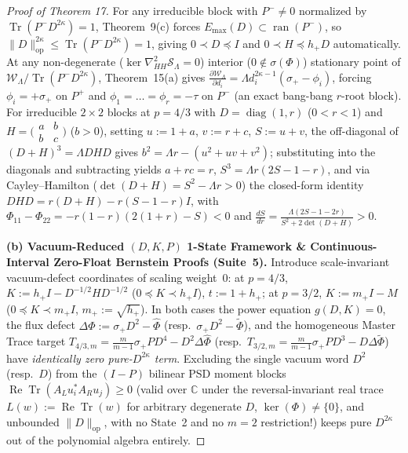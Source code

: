 \documentclass[10pt,letterpaper]{article}
\newcommand{\C}{\mathbb{C}}
\newcommand{\Tr}{\operatorname{Tr}}
\newcommand{\ran}{\operatorname{ran}}
\newcommand{\diag}{\operatorname{diag}}
\newcommand{\op}{\mathrm{op}}
\begin{document}
\begin{proof}[Proof of Theorem 17]
For any irreducible block with $P^- \neq 0$ normalized by $\Tr(P^- D^{2\kappa}) = 1$, Theorem~9(c) forces $E_{\max}(D) \subset \ran(P^-)$, so $\|D\|_{\op}^{2\kappa} \le \Tr(P^- D^{2\kappa}) = 1$, giving $0 \prec D \preceq I$ and $0 \prec H \preceq h_+ D$ automatically. At any non-degenerate ($\ker\nabla^2_{HH}\mathcal{S}_\Lambda = 0$) interior ($0 \notin \sigma(\Phi)$) stationary point of $\mathcal{W}_\Lambda / \Tr(P^- D^{2\kappa})$, Theorem~15(a) gives $\frac{\partial\mathcal{W}_\Lambda}{\partial d_i} = \Lambda d_i^{2\kappa-1}(\sigma_+ - \phi_i)$, forcing $\phi_i = +\sigma_+$ on $P^+$ and $\phi_1 = \dots = \phi_r = -\tau$ on $P^-$ (an exact bang-bang $r$-root block). For irreducible $2\times 2$ blocks at $p = 4/3$ with $D = \diag(1, r)$ ($0 < r < 1$) and $H = \bigl(\begin{smallmatrix} a & b \\ b & c \end{smallmatrix}\bigr)$ ($b > 0$), setting $u := 1+a$, $v := r+c$, $S := u+v$, the off-diagonal of $(D+H)^3 = \Lambda D H D$ gives $b^2 = \Lambda r - (u^2+uv+v^2)$; substituting into the diagonals and subtracting yields $a + rc = r$, $S^3 = \Lambda r(2S - 1 - r)$, and via Cayley--Hamilton ($\det(D+H) = S^2 - \Lambda r > 0$) the closed-form identity $D H D = r(D + H) - r(S - 1 - r)I$, with $\Phi_{11} - \Phi_{22} = -r(1-r)(2(1+r)-S) < 0$ and $\frac{dS}{dr} = \frac{\Lambda(2S-1-2r)}{S^2 + 2\det(D+H)} > 0$.

\textbf{(b) Vacuum-Reduced $(D, K, P)$ 1-State Framework \& Continuous-Interval Zero-Float Bernstein Proofs (Suite~5).}
Introduce scale-invariant vacuum-defect coordinates of scaling weight~$0$: at $p = 4/3$, $K := h_+ I - D^{-1/2} H D^{-1/2}$ ($0 \preceq K \prec h_+ I$), $t := 1 + h_+$; at $p = 3/2$, $K := m_+ I - M$ ($0 \preceq K \prec m_+ I$, $m_+ := \sqrt{h_+}$). In both cases the power equation $g(D, K) = 0$, the flux defect $\Delta\Phi := \sigma_+ D^2 - \widehat{\Phi}$ (resp.\ $\sigma_+ D^2 - \widetilde{\Phi}$), and the homogeneous Master Trace target $T_{4/3,m} = \frac{m}{m-1}\sigma_+ P D^4 - D^2\Delta\widehat{\Phi}$ (resp.\ $T_{3/2,m} = \frac{m}{m-1}\sigma_+ P D^3 - D\Delta\widetilde{\Phi}$) have \emph{identically zero pure-$D^{2\kappa}$ term}. Excluding the single vacuum word $D^2$ (resp.\ $D$) from the $(I-P)$ bilinear PSD moment blocks $\operatorname{Re}\Tr(A_L u_i^* A_R u_j) \ge 0$ (valid over $\C$ under the reversal-invariant real trace $L(w) := \operatorname{Re}\Tr(w)$ for arbitrary degenerate $D$, $\ker(\Phi) \neq \{0\}$, and unbounded $\|D\|_{\op}$, with no State~2 and no $m = 2$ restriction!) keeps pure $D^{2\kappa}$ out of the polynomial algebra entirely.


\end{proof}
\end{document}
